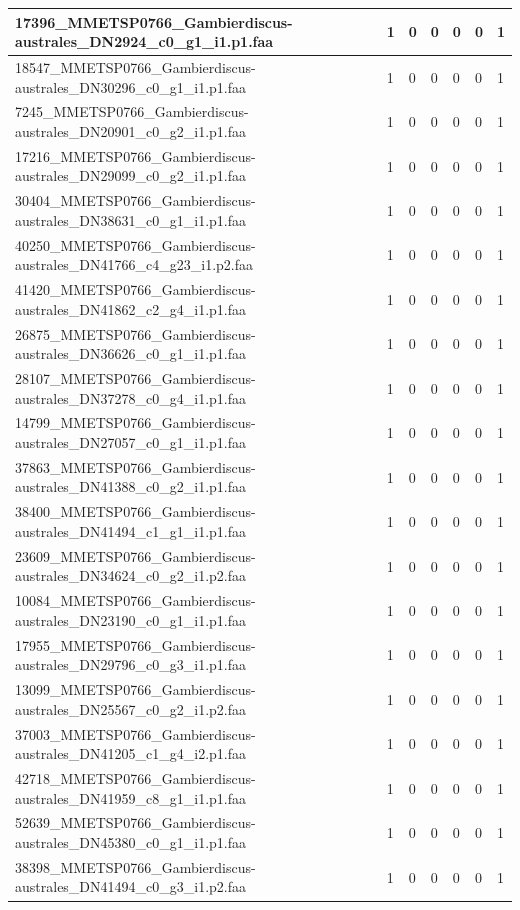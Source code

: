 \documentclass[12pt]{article}
\begin{document}
\begin{longtable}{ | p{2cm} | p{2cm} |p{2.5cm} | p{2cm} | p{2.5cm} |  p{2cm} | p{2cm} |}
 \hline 
17396\_MMETSP0766\_Gambierdiscus-australes\_DN2924\_c0\_g1\_i1.p1.faa&1&0&0&0&0&1\\ 
 \hline 
18547\_MMETSP0766\_Gambierdiscus-australes\_DN30296\_c0\_g1\_i1.p1.faa&1&0&0&0&0&1\\ 
 \hline 
7245\_MMETSP0766\_Gambierdiscus-australes\_DN20901\_c0\_g2\_i1.p1.faa&1&0&0&0&0&1\\ 
 \hline 
17216\_MMETSP0766\_Gambierdiscus-australes\_DN29099\_c0\_g2\_i1.p1.faa&1&0&0&0&0&1\\ 
 \hline 
30404\_MMETSP0766\_Gambierdiscus-australes\_DN38631\_c0\_g1\_i1.p1.faa&1&0&0&0&0&1\\ 
 \hline 
40250\_MMETSP0766\_Gambierdiscus-australes\_DN41766\_c4\_g23\_i1.p2.faa&1&0&0&0&0&1\\ 
 \hline 
41420\_MMETSP0766\_Gambierdiscus-australes\_DN41862\_c2\_g4\_i1.p1.faa&1&0&0&0&0&1\\ 
 \hline 
26875\_MMETSP0766\_Gambierdiscus-australes\_DN36626\_c0\_g1\_i1.p1.faa&1&0&0&0&0&1\\ 
 \hline 
28107\_MMETSP0766\_Gambierdiscus-australes\_DN37278\_c0\_g4\_i1.p1.faa&1&0&0&0&0&1\\ 
 \hline 
14799\_MMETSP0766\_Gambierdiscus-australes\_DN27057\_c0\_g1\_i1.p1.faa&1&0&0&0&0&1\\ 
 \hline 
37863\_MMETSP0766\_Gambierdiscus-australes\_DN41388\_c0\_g2\_i1.p1.faa&1&0&0&0&0&1\\ 
 \hline 
38400\_MMETSP0766\_Gambierdiscus-australes\_DN41494\_c1\_g1\_i1.p1.faa&1&0&0&0&0&1\\ 
 \hline 
23609\_MMETSP0766\_Gambierdiscus-australes\_DN34624\_c0\_g2\_i1.p2.faa&1&0&0&0&0&1\\ 
 \hline 
10084\_MMETSP0766\_Gambierdiscus-australes\_DN23190\_c0\_g1\_i1.p1.faa&1&0&0&0&0&1\\ 
 \hline 
17955\_MMETSP0766\_Gambierdiscus-australes\_DN29796\_c0\_g3\_i1.p1.faa&1&0&0&0&0&1\\ 
 \hline 
13099\_MMETSP0766\_Gambierdiscus-australes\_DN25567\_c0\_g2\_i1.p2.faa&1&0&0&0&0&1\\ 
 \hline 
37003\_MMETSP0766\_Gambierdiscus-australes\_DN41205\_c1\_g4\_i2.p1.faa&1&0&0&0&0&1\\ 
 \hline 
42718\_MMETSP0766\_Gambierdiscus-australes\_DN41959\_c8\_g1\_i1.p1.faa&1&0&0&0&0&1\\ 
 \hline 
52639\_MMETSP0766\_Gambierdiscus-australes\_DN45380\_c0\_g1\_i1.p1.faa&1&0&0&0&0&1\\ 
 \hline 
38398\_MMETSP0766\_Gambierdiscus-australes\_DN41494\_c0\_g3\_i1.p2.faa&1&0&0&0&0&1\\ 

\end{longtable}
\end{document}
